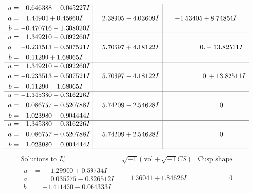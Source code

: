 \documentclass[1p]{elsarticle_modified}
\theoremstyle{definition}
\newcommand{\I}{\sqrt{-1}}
\begin{document}
$$\begin{array}{c|c|c}
\begin{aligned}
u &= \phantom{-}0.646388 - 0.045227 I \\
a &= \phantom{-}1.44904 + 0.45860 I \\
b &= -0.470716 - 1.308020 I\end{aligned}
 & \phantom{-}2.38905 - 4.03609 I & -1.53405 + 8.74854 I \\ \hline\begin{aligned}
u &= \phantom{-}1.349210 + 0.092260 I \\
a &= -0.233513 + 0.507521 I \\
b &= \phantom{-}0.11290 + 1.68065 I\end{aligned}
 & \phantom{-}5.70697 + 4.18122 I & \phantom{-0.000000 } 0. - 13.82511 I \\ \hline\begin{aligned}
u &= \phantom{-}1.349210 - 0.092260 I \\
a &= -0.233513 - 0.507521 I \\
b &= \phantom{-}0.11290 - 1.68065 I\end{aligned}
 & \phantom{-}5.70697 - 4.18122 I & \phantom{-0.000000 -}0. + 13.82511 I \\ \hline\begin{aligned}
u &= -1.345380 + 0.316226 I \\
a &= \phantom{-}0.086757 - 0.520788 I \\
b &= \phantom{-}1.023980 - 0.904444 I\end{aligned}
 & \phantom{-}5.74209 - 2.54628 I & \phantom{-0.000000 } 0 \\ \hline\begin{aligned}
u &= -1.345380 - 0.316226 I \\
a &= \phantom{-}0.086757 + 0.520788 I \\
b &= \phantom{-}1.023980 + 0.904444 I\end{aligned}
 & \phantom{-}5.74209 + 2.54628 I & \phantom{-0.000000 } 0\\
 \hline 
 \end{array}$$\newpage$$\begin{array}{c|c|c}  
\text{Solutions to }I^u_{2}& \I (\text{vol} + \sqrt{-1}CS) & \text{Cusp shape}\\
 \hline 
\begin{aligned}
u &= \phantom{-}1.29900 + 0.59734 I \\
a &= \phantom{-}0.035275 - 0.826512 I \\
b &= -1.411430 - 0.064333 I\end{aligned}
 & \phantom{-}1.36041 + 1.84626 I & \phantom{-0.000000 } 0 \\ \hline\begin{aligned}

\end{aligned}
\end{array}$$
\end{document}
